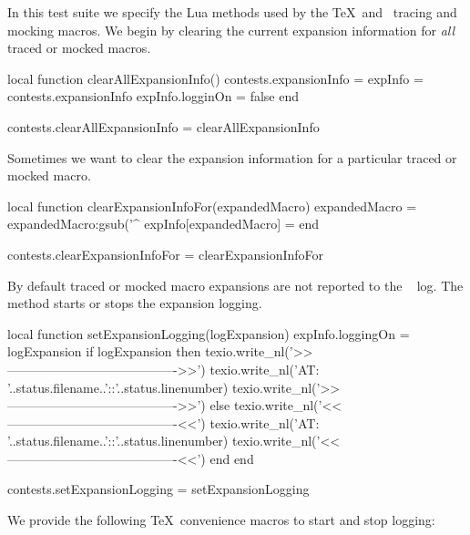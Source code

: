 
In this test suite we specify the Lua methods used by the \TeX\ and 
\ConTeXt\ tracing and mocking macros. We begin by clearing the current 
expansion information for \emph{all} traced or mocked macros. 

\startLuaCode
local function clearAllExpansionInfo()
  contests.expansionInfo = { }
  expInfo                = contests.expansionInfo
  expInfo.logginOn       = false
end

contests.clearAllExpansionInfo = clearAllExpansionInfo
\stopLuaCode

\startMkIVCode
\def\clearAllExpansionInfo{%
  \directlua{%
    thirddata.contests.clearAllExpansionInfo()
  }
}
\stopMkIVCode

Sometimes we want to clear the expansion information for a particular 
traced or mocked macro. 

\startLuaCode
local function clearExpansionInfoFor(expandedMacro)
  expandedMacro = expandedMacro:gsub('^%
  expInfo[expandedMacro] = { }
end

contests.clearExpansionInfoFor = clearExpansionInfoFor
\stopLuaCode

\startMkIVCode
\def\clearExpansionInfoFor#1{%
  \directlua{%
    thirddata.contests.clearExpansionInfoFor('#1')
  }
}
\stopMkIVCode

By default traced or mocked macro expansions are not reported to the 
\LuaTeX\  log. The  method starts or 
stops the expansion logging. 

\startLuaCode
local function setExpansionLogging(logExpansion)
  expInfo.loggingOn = logExpansion
  if logExpansion then
    texio.write_nl('>>---------------------------------------->>')
    texio.write_nl('AT: '..status.filename..'::'..status.linenumber)
    texio.write_nl('>>---------------------------------------->>')
  else
    texio.write_nl('<<----------------------------------------<<')
    texio.write_nl('AT: '..status.filename..'::'..status.linenumber)
    texio.write_nl('<<----------------------------------------<<')
  end
end

contests.setExpansionLogging = setExpansionLogging
\stopLuaCode

We provide the following \TeX\ convenience macros to start and stop 
logging: 

\startMkIVCode
\def\startLoggingExpansions{%
  \directlua{thirddata.contests.setExpansionLogging(true)}
}
\def\stopLoggingExpansions{%
  \directlua{thirddata.contests.setExpansionLogging(false)}
}
\stopMkIVCode

